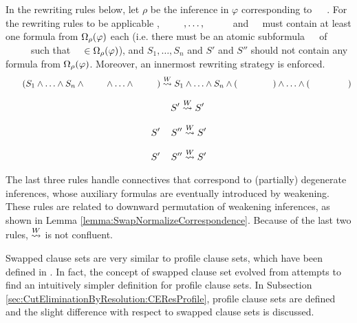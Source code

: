 \documentclass{llncs}
\begin{document}
\begin{definition}[$\normalizePlusTimesS$]
\label{definition:NormalizationPlusTimesSwap}
In the rewriting rules below, let $\rho$ be the inference in $\varphi$ corresponding to $\hF{\structtimes_{\rho}}$. For the rewriting rules to be applicable
%
%
, $\hF{S_{n+1}}, \ldots, \hF{S_{n+m}}$ and $\hF{S}$ must contain at least one formula from $\Omega_{\rho}(\varphi)$ each (i.e. there must be an atomic subformula $\hF{A}$ of $\hF{S_{n+k}}$ such that $\hF{A} \in \occInference{\varphi}{\rho}$), and $S_1, \ldots, S_n$ and $S'$ and $S''$ should not contain any formula from $\Omega_{\rho}(\varphi)$. Moreover, an innermost rewriting strategy is enforced.
$$
\hF{S} \hF{\structtimes_{\rho}} (S_1 \structplus \ldots \structplus S_n \structplus \hF{S_{n+1}} \structplus \ldots \structplus \hF{S_{n+m}}) \normalizePlusTimesS  S_1 \structplus \ldots \structplus S_n \structplus (\hF{S} \hF{\structtimes_{\rho}} \hF{S_{n+1}}) \structplus \ldots \structplus (\hF{S} \hF{\structtimes_{\rho}} \hF{S_{n+m}}) 
$$
\begin{multicols}{3}{
$$
\hF{S} \hF{\structplus_{\rho}} S' \normalizePlusTimesS  S'
$$

$$
S' \hF{\structtimes_{\rho}} S'' \normalizePlusTimesS  S'
$$

$$
S' \hF{\structplus_{\rho}} S'' \normalizePlusTimesS  S'
$$
}\end{multicols}

\end{definition}

\begin{remark}
The last three rules handle connectives that correspond to (partially) degenerate inferences, whose auxiliary formulas are eventually introduced by weakening. These rules are related to downward permutation of weakening inferences, as shown in Lemma \ref{lemma:SwapNormalizeCorrespondence}. Because of the last two rules, $\normalizePlusTimesS$ is not confluent.
\end{remark}


Swapped clause sets are very similar to profile clause sets, which have been defined in \cite{Hetzl2007CharacteristicClauseSetsandProofTransformations}. In fact, the concept of swapped clause set evolved from attempts to find an intuitively simpler definition for profile clause sets. In Subsection \ref{sec:CutEliminationByResolution:CEResProfile}, profile clause sets are defined and the slight difference with respect to swapped clause sets is discussed.
\end{document}
